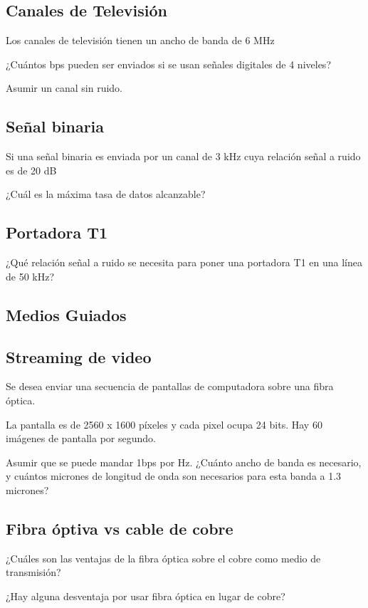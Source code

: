 \documentclass[12pt]{report}
\begin{document}
\begin{exer}
\subsection{Canales de Televisión \sthree}
Los canales de televisión tienen un ancho de banda de 6 MHz

¿Cuántos bps pueden ser enviados si se usan señales digitales de 4 niveles?

Asumir un canal sin ruido.
\end{exer}

\begin{exer}
\subsection{Señal binaria \stwo}
Si una señal binaria es enviada por un canal de 3 kHz cuya relación señal a ruido es de 20 dB

¿Cuál es la máxima tasa de datos alcanzable?
\end{exer}

\begin{exer}
\subsection{Portadora T1 \sthree}
¿Qué relación señal a ruido se necesita para poner una portadora T1 en una línea de 50 kHz?
\end{exer}

\begin{exer}
\section{Medios Guiados}
\subsection{Streaming de video \stwo}
Se desea enviar una secuencia de pantallas de computadora sobre una fibra óptica.

La pantalla es de 2560 x 1600 píxeles y cada pixel ocupa 24 bits. Hay 60 imágenes de pantalla por segundo.

Asumir que se puede mandar 1bps por Hz. ¿Cuánto ancho de banda es necesario, y cuántos micrones de longitud de onda son necesarios para esta banda a 1.3 micrones?
\end{exer}

\begin{exer}
\subsection{Fibra óptiva vs cable de cobre \stwo \steo}
¿Cuáles son las ventajas de la fibra óptica sobre el cobre como medio de transmisión?

¿Hay alguna desventaja por usar fibra óptica en lugar de cobre?
\end{exer}
\end{document}
